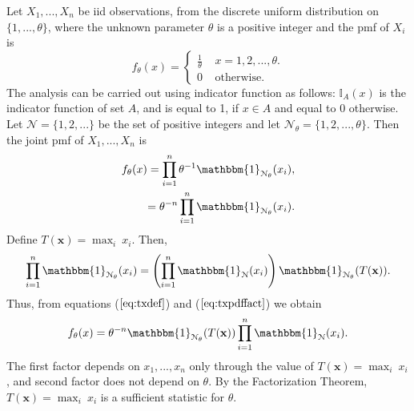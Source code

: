 \documentclass[a4paper,english,12pt]{article}
\newcommand{\bx}{\mathbf{x}}
\begin{document}
\begin{exmp}
Let $X_1,...,X_n$ be iid observations, from the discrete uniform distribution on $\{1,...,\theta\}$, where the unknown parameter $\theta$ is a positive integer and the pmf of $X_i$ is
\begin{equation*}
f_\theta(x) = 
\begin{cases} 
\frac{1}{\theta} ~~~~~ x=1,2,...,\theta. \\
0 ~~~~~\text{otherwise}.
\end{cases}
\end{equation*}
The analysis can be carried out using indicator function as follows:
$\mathbb{I}_A(x)$ is the indicator function of set $A$, and is equal to 1, if $x \in A$ and equal to 0 otherwise. Let $\mathcal{N} = \{1,2,...\}$ be the set of positive integers and let $\mathcal{N}_\theta =\{1,2,...,\theta \}$. Then the joint pmf of $X_1,...,X_n$ is 
\begin{eqnarray}
f_\theta(x) = \prod_{i=1}^{n}{\theta^{-1}\mathbbm{1}_{\mathcal{N}_\theta} (x_i)}, \nonumber \\
= \theta^{-n}\prod_{i=1}^{n}{\mathbbm{1}_{\mathcal{N}_\theta} (x_i)}.  \label{eq:txdef}
\end{eqnarray}
Define $T(\bx)=\displaystyle\max_i ~x_i$. Then,
\begin{eqnarray}
\prod_{i=1}^{n}{\mathbbm{1}_{\mathcal{N}_\theta} (x_i)}=\left(\prod_{i=1}^{n}{\mathbbm{1}_{\mathcal{N}} (x_i)}\right)\mathbbm{1}_{\mathcal{N}_\theta} (T(\bx)). \label{eq:txpdffact}
\end{eqnarray}
Thus, from equations ($ \ref{eq:txdef} $) and ($ \ref{eq:txpdffact} $) we obtain
\begin{equation}
f_\theta(x) = \theta^{-n}\mathbbm{1}_{\mathcal{N}_\theta} (T(\bx))\prod_{i=1}^{n}{\mathbbm{1}_{\mathcal{N}} (x_i)}.  
\end{equation}
The first factor depends on $x_1,...,x_n$ only through the value of $T(\bx)=\displaystyle\max_i ~x_i$, and second factor does not depend on $\theta$. By the Factorization Theorem, $T(\bx)=\displaystyle\max_i ~x_i$ is a sufficient statistic for $\theta$.
\end{exmp}
\end{document}
